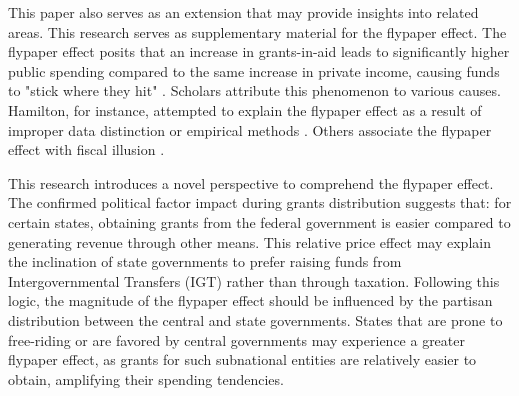 This paper also serves as an extension that may provide insights into related areas. This research serves as supplementary material for the flypaper effect. The flypaper effect posits that an increase in grants-in-aid leads to significantly higher public spending compared to the same increase in private income, causing funds to "stick where they hit" \parencite{inman2008flypaper}. Scholars attribute this phenomenon to various causes. Hamilton, for instance, attempted to explain the flypaper effect as a result of improper data distinction or empirical methods \parencite{hamilton1986flypaper}. Others associate the flypaper effect with fiscal illusion \parencite{gramlich1997stimulative}.

This research introduces a novel perspective to comprehend the flypaper effect. The confirmed political factor impact during grants distribution suggests that: for certain states, obtaining grants from the federal government is easier compared to generating revenue through other means. This relative price effect may explain the inclination of state governments to prefer raising funds from Intergovernmental Transfers (IGT) rather than through taxation. Following this logic, the magnitude of the flypaper effect should be influenced by the partisan distribution between the central and state governments. States that are prone to free-riding or are favored by central governments may experience a greater flypaper effect, as grants for such subnational entities are relatively easier to obtain, amplifying their spending tendencies.

